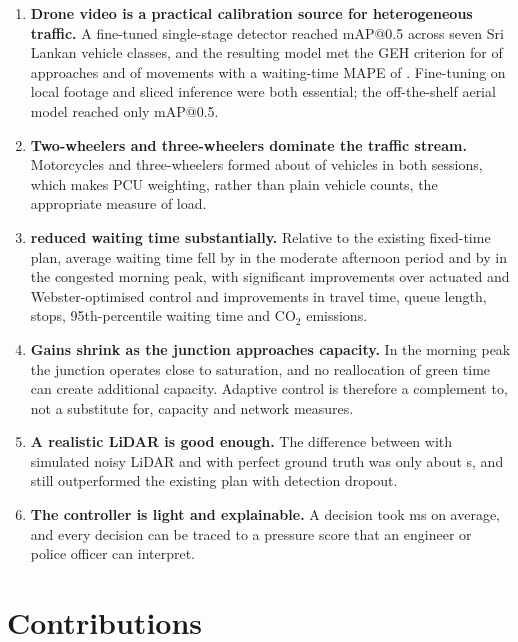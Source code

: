 \begin{enumerate}[leftmargin=*]
  \item \textbf{Drone video is a practical calibration source for heterogeneous traffic.} A fine-tuned single-stage detector reached  mAP@0.5 across seven Sri Lankan vehicle classes, and the resulting model met the GEH criterion for  of approaches and  of movements with a waiting-time MAPE of . Fine-tuning on local footage and sliced inference were both essential; the off-the-shelf aerial model reached only  mAP@0.5.
  \item \textbf{Two-wheelers and three-wheelers dominate the traffic stream.} Motorcycles and three-wheelers formed about  of vehicles in both sessions, which makes PCU weighting, rather than plain vehicle counts, the appropriate measure of load.
  \item \textbf{\prism{} reduced waiting time substantially.} Relative to the existing fixed-time plan, average waiting time fell by  in the moderate afternoon period and by  in the congested morning peak, with significant improvements over actuated and Webster-optimised control and improvements in travel time, queue length, stops, 95th-percentile waiting time and CO$_2$ emissions.
  \item \textbf{Gains shrink as the junction approaches capacity.} In the morning peak the junction operates close to saturation, and no reallocation of green time can create additional capacity. Adaptive control is therefore a complement to, not a substitute for, capacity and network measures.
  \item \textbf{A realistic LiDAR is good enough.} The difference between \prism{} with simulated noisy LiDAR and with perfect ground truth was only about  s, and \prism{} still outperformed the existing plan with  detection dropout.
  \item \textbf{The controller is light and explainable.} A decision took  ms on average, and every decision can be traced to a pressure score that an engineer or police officer can interpret.
\end{enumerate}

\section{Contributions}

